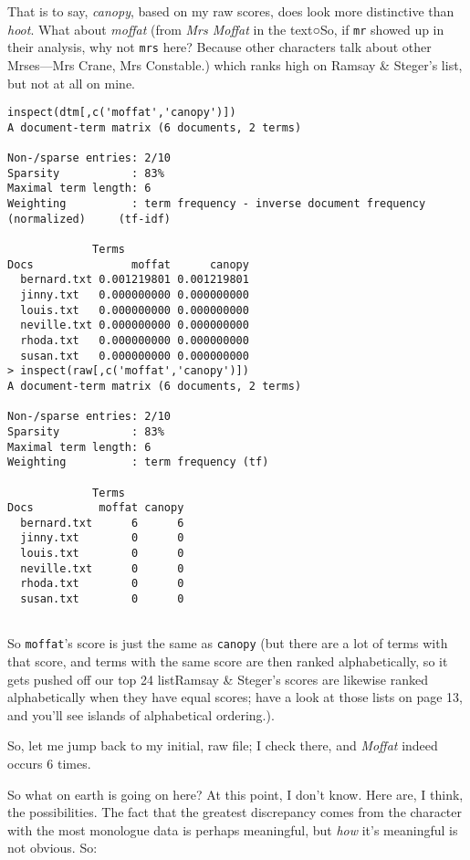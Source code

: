\documentclass[
  12pt,
]{article}
\begin{document}
That is to say, \emph{canopy}, based on my raw scores, does look more
distinctive than \emph{hoot}. What about \emph{moffat} (from \emph{Mrs
Moffat} in the text○{So, if \texttt{mr} showed up in their analysis, why
not \texttt{mrs} here? Because other characters talk about other
Mrses---Mrs Crane, Mrs Constable.}) which ranks high on Ramsay \&
Steger's list, but not at all on mine.

\begin{verbatim}
inspect(dtm[,c('moffat','canopy')])
A document-term matrix (6 documents, 2 terms)

Non-/sparse entries: 2/10
Sparsity           : 83%
Maximal term length: 6 
Weighting          : term frequency - inverse document frequency (normalized)     (tf-idf)

             Terms
Docs               moffat      canopy
  bernard.txt 0.001219801 0.001219801
  jinny.txt   0.000000000 0.000000000
  louis.txt   0.000000000 0.000000000
  neville.txt 0.000000000 0.000000000
  rhoda.txt   0.000000000 0.000000000
  susan.txt   0.000000000 0.000000000
> inspect(raw[,c('moffat','canopy')])
A document-term matrix (6 documents, 2 terms)

Non-/sparse entries: 2/10
Sparsity           : 83%
Maximal term length: 6 
Weighting          : term frequency (tf)

             Terms
Docs          moffat canopy
  bernard.txt      6      6
  jinny.txt        0      0
  louis.txt        0      0
  neville.txt      0      0
  rhoda.txt        0      0
  susan.txt        0      0
 
\end{verbatim}

So \texttt{moffat}'s score is just the same as \texttt{canopy} (but
there are a lot of terms with that score, and terms with the same score
are then ranked alphabetically, so it gets pushed off our top 24
list{Ramsay \& Steger's scores are likewise ranked alphabetically when
they have equal scores; have a look at those lists on page 13, and
you'll see islands of alphabetical ordering.}).

So, let me jump back to my initial, raw file; I check there, and
\emph{Moffat} indeed occurs 6 times.

So what on earth is going on here? At this point, I don't know. Here
are, I think, the possibilities. The fact that the greatest discrepancy
comes from the character with the most monologue data is perhaps
meaningful, but \emph{how} it's meaningful is not obvious. So:
\end{document}
